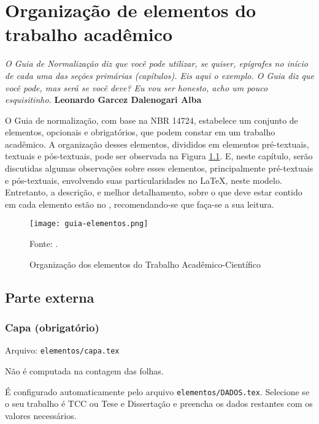 \chapter{Organização de elementos do trabalho acadêmico}
\begin{epigrafe}
    \textit{O Guia de Normalização diz que você pode utilizar, se quiser, epígrafes no início de cada uma das seções primárias (capítulos). Eis aqui o exemplo. O Guia diz que você pode, mas será se você deve? Eu vou ser honesto, acho um pouco esquisitinho.} \textbf{Leonardo Garcez Dalenogari Alba}
\end{epigrafe}

O Guia de normalização, com base na NBR 14724, estabelece um conjunto de elementos, opcionais e obrigatórios, que podem constar em um trabalho acadêmico. A organização desses elementos, divididos em elementos pré-textuais, textuais e pós-textuais, pode ser observada na Figura \ref{figura:elementos-guia}. E, neste capítulo, serão discutidas algumas observações sobre esses elementos, principalmente pré-textuais e pós-textuais, envolvendo suas particularidades no \LaTeX{}, neste modelo. Entretanto, a descrição, e melhor detalhamento, sobre o que deve estar contido em cada elemento estão no , recomendando-se que faça-se a sua leitura.

\begin{figure}[H]
    \Centering\singlespacing
    \caption{Organização dos elementos do Trabalho Acadêmico-Científico}
    \label{figura:elementos-guia}
    \texttt{[image: guia-elementos.png]}
    
    \footnotesize
    Fonte: \textcite{livro:iffar-guia-normalizacao-2022}.
  \end{figure}

\section{Parte externa}
    \subsection{Capa (obrigatório)}
    Arquivo: \texttt{elementos/capa.tex}

    Não é computada na contagem das folhas.

    É configurado automaticamente pelo arquivo \texttt{elementos/DADOS.tex}. Selecione se o seu trabalho é TCC ou Tese e Dissertação e preencha os dados restantes com os valores necessários.

